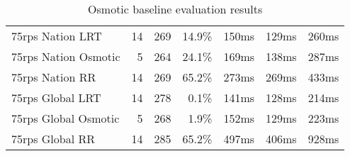 \begin{table}[]
\begin{tabular}{lrrrrrr}
75rps Nation LRT     & 14                                                             & 269                                                                                       & 14.9\%                                                                        & 150ms                                                       & 129ms                                                         & 260ms                                                      \\
75rps Nation Osmotic & 5                                                              & 264                                                                                       & 24.1\%                                                                        & 169ms                                                       & 138ms                                                         & 287ms                                                      \\
75rps Nation RR      & 14                                                             & 269                                                                                       & 65.2\%                                                                        & 273ms                                                       & 269ms                                                         & 433ms                                                      \\ \hline
75rps Global LRT     & 14                                                             & 278                                                                                       & 0.1\%                                                                         & 141ms                                                       & 128ms                                                         & 214ms                                                      \\
75rps Global Osmotic & 5                                                              & 268                                                                                       & 1.9\%                                                                         & 152ms                                                       & 129ms                                                         & 223ms                                                      \\
75rps Global RR      & 14                                                             & 285                                                                                       & 65.2\%                                                                        & 497ms                                                       & 406ms                                                         & 928ms                                                      \\ \hline
\end{tabular}
\caption{Osmotic baseline evaluation results}
\label{tab:osmotic_base}
\end{table}